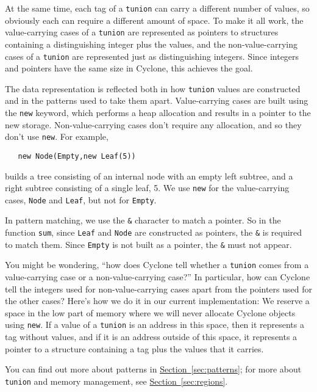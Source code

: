 At the same time, each tag of a \texttt{tunion} can carry a different
number of values, so obviously each can require a different amount of
space.  To make it all work, the value-carrying cases of a
\texttt{tunion} are represented as pointers to structures containing a
distinguishing integer plus the values, and the non-value-carrying
cases of a \texttt{tunion} are represented just as distinguishing
integers.  Since integers and pointers have the same size in Cyclone,
this achieves the goal.

The data representation is reflected both in how \texttt{tunion}
values are constructed and in the patterns used to take them apart.
Value-carrying cases are built using the \texttt{new} keyword, which
performs a heap allocation and results in a pointer to the new
storage.  Non-value-carrying cases don't require any allocation, and
so they don't use \texttt{new}.  For example,
\begin{verbatim}
   new Node(Empty,new Leaf(5))
\end{verbatim}
builds a tree consisting of an internal node with an empty left
subtree, and a right subtree consisting of a single leaf, 5.  We use
\texttt{new} for the value-carrying cases, \texttt{Node} and
\texttt{Leaf}, but not for \texttt{Empty}.

In pattern matching, we use the \texttt{\&} character to match a
pointer.  So in the function \texttt{sum}, since \texttt{Leaf} and
\texttt{Node} are constructed as pointers, the \texttt{\&} is required
to match them.  Since \texttt{Empty} is not built as a pointer, the
\texttt{\&} must not appear.

You might be wondering, ``how does Cyclone tell whether a
\texttt{tunion} comes from a value-carrying case or a
non-value-carrying case?''  In particular, how can Cyclone tell the
integers used for non-value-carrying cases apart from the pointers
used for the other cases?  Here's how we do it in our current
implementation:  We reserve a space in the low part of memory where we
will never allocate Cyclone objects using \texttt{new}.  If a value of
a \texttt{tunion} is an address in this space, then it represents a
tag without values, and if it is an address outside of this space, it
represents a pointer to a structure containing a tag plus the values
that it carries.
  
You can find out more about patterns in
\hyperref[{sec:patterns}]{Section~\ref{sec:patterns}}; for more about
\texttt{tunion} and memory management, see
\hyperref[{sec:regions}]{Section~\ref{sec:regions}}.

